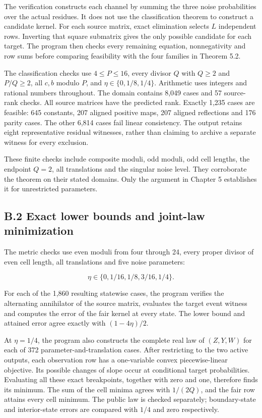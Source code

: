 \documentclass[
]{article}
\begin{document}
The verification constructs each channel by summing the three noise
probabilities over the actual residues. It does not use the
classification theorem to construct a candidate kernel. For each source
matrix, exact elimination selects \(L\) independent rows. Inverting that
square submatrix gives the only possible candidate for each target. The
program then checks every remaining equation, nonnegativity and row sums
before comparing feasibility with the four families in Theorem 5.2.

The classification checks use \(4\le P\le16\), every divisor \(Q\) with
\(Q\ge2\) and \(P/Q\ge2\), all \(c,b\) modulo \(P\), and
\(\eta\in\{0,1/8,1/4\}\). Arithmetic uses integers and rational numbers
throughout. The domain contains 8,049 cases and 57 source-rank checks.
All source matrices have the predicted rank. Exactly 1,235 cases are
feasible: 645 constants, 207 aligned positive maps, 207 aligned
reflections and 176 parity cases. The other 6,814 cases fail linear
consistency. The output retains eight representative residual witnesses,
rather than claiming to archive a separate witness for every exclusion.

These finite checks include composite moduli, odd moduli, odd cell
lengths, the endpoint \(Q=2\), all translations and the singular noise
level. They corroborate the theorem on their stated domains. Only the
argument in Chapter 5 establishes it for unrestricted parameters.

\subsection{B.2 Exact lower bounds and joint-law
minimization}\label{b.2-exact-lower-bounds-and-joint-law-minimization}

The metric checks use even moduli from four through 24, every proper
divisor of even cell length, all translations and five noise parameters:

\[
\eta\in\{0,1/16,1/8,3/16,1/4\}.
\]

For each of the 1,860 resulting statewise cases, the program verifies
the alternating annihilator of the source matrix, evaluates the target
event witness and computes the error of the fair kernel at every state.
The lower bound and attained error agree exactly with \((1-4\eta)/2\).

At \(\eta=1/4\), the program also constructs the complete real law of
\((Z,Y,W)\) for each of 372 parameter-and-translation cases. After
restricting to the two active outputs, each observation row has a
one-variable convex piecewise-linear objective. Its possible changes of
slope occur at conditional target probabilities. Evaluating all these
exact breakpoints, together with zero and one, therefore finds its
minimum. The sum of the cell minima agrees with \(1/(2Q)\), and the fair
row attains every cell minimum. The public law is checked separately;
boundary-state and interior-state errors are compared with \(1/4\) and
zero respectively.
\end{document}

